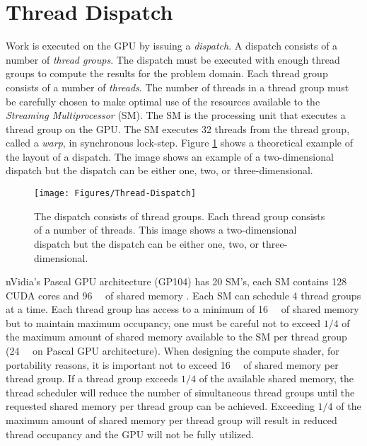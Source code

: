 \section{Thread Dispatch}
\label{sec:Thread-Dispatch}

Work is executed on the GPU by issuing a \emph{dispatch}. A dispatch consists of a number of \emph{thread groups}. The dispatch must be executed with enough thread groups to compute the results for the problem domain. Each thread group consists of a number of \emph{threads}. The number of threads in a thread group must be carefully chosen to make optimal use of the resources available to the \emph{Streaming Multiprocessor} (SM). The SM is the processing unit that executes a thread group on the GPU. The SM executes 32 threads from the thread group, called a \emph{warp}, in synchronous lock-step. Figure \ref{fig:Thread-Dispatch} shows a theoretical example of the layout of a dispatch. The image shows an example of a two-dimensional dispatch but the dispatch can be either one, two, or three-dimensional.

\begin{figure}[H]
\centering
\texttt{[image: Figures/Thread-Dispatch]}
\decoRule
\caption{The dispatch consists of thread groups. Each thread group consists of a number of threads. This image shows a two-dimensional dispatch but the dispatch can be either one, two, or three-dimensional.}
\label{fig:Thread-Dispatch}
\end{figure}

nVidia's Pascal GPU architecture (GP104) has 20 SM's, each SM contains 128 CUDA cores and \SI{96}{\kilo\byte} of shared memory \parencite{25_geforce_gtx_1080_whitepaper_2016}. Each SM can schedule 4 thread groups at a time. Each thread group has access to a minimum of \SI{16}{\kilo\byte} of shared memory but to maintain maximum occupancy, one must be careful not to exceed $1/4$ of the maximum amount of shared memory available to the SM per thread group (\SI{24}{\kilo\byte} on Pascal GPU architecture). When designing the compute shader, for portability reasons, it is important not to exceed \SI{16}{\kilo\byte} of shared memory per thread group. If a thread group exceeds $1/4$ of the available shared memory, the thread scheduler will reduce the number of simultaneous thread groups until the requested shared memory per thread group can be achieved. Exceeding $1/4$ of the maximum amount of shared memory per thread group will result in reduced thread occupancy and the GPU will not be fully utilized.

